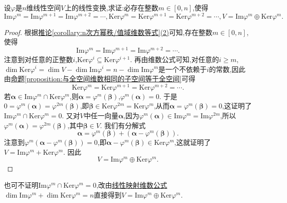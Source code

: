 \documentclass[../../main.tex]{subfiles}%
\begin{document}
\begin{proposition}\label{proposition:线性映射像空间与和空间等式链}
设\(\varphi\)是\(n\)维线性空间\(V\)上的线性变换,求证:必存在整数\(m\in[0,n]\),使得
\[
\text{Im}\varphi^m = \text{Im}\varphi^{m + 1} = \text{Im}\varphi^{m + 2} = \cdots, \text{Ker}\varphi^m = \text{Ker}\varphi^{m + 1} = \text{Ker}\varphi^{m + 2} = \cdots, V = \text{Im}\varphi^m\oplus\text{Ker}\varphi^m.
\]
\end{proposition}
\begin{proof}

根据\hyperref[corollary:n次方幂秩/值域维数等式]{推论\ref{corollary:n次方幂秩/值域维数等式}(2)}可知,存在整数\(m\in[0,n]\),使得
\[
\text{Im}\varphi^m = \text{Im}\varphi^{m + 1} = \text{Im}\varphi^{m + 2} = \cdots.
\]
注意到对任意的正整数\(i\),\(\text{Ker}\varphi^i\subseteq\text{Ker}\varphi^{i + 1}\). 再由维数公式可知,对任意的\(i\geqslant  m\),\(\dim\text{Ker}\varphi^i=\dim V - \dim\text{Im}\varphi^i=n - \dim\text{Im}\varphi^m\)是一个不依赖于\(i\)的常数,因此由\hyperref[proposition:与全空间维数相同的子空间等于全空间]{命题\ref{proposition:与全空间维数相同的子空间等于全空间}}可得
\[
\text{Ker}\varphi^m = \text{Ker}\varphi^{m + 1} = \text{Ker}\varphi^{m + 2} = \cdots.
\]
若\(\boldsymbol{\alpha}\in\text{Im}\varphi^m\cap\text{Ker}\varphi^m\),则\(\boldsymbol{\alpha}=\varphi^m(\boldsymbol{\beta})\),\(\varphi^m(\boldsymbol{\alpha}) = 0\). 于是\(0=\varphi^m(\boldsymbol{\alpha})=\varphi^{2m}(\boldsymbol{\beta})\),即\(\boldsymbol{\beta}\in\text{Ker}\varphi^{2m}=\text{Ker}\varphi^m\),从而\(\boldsymbol{\alpha}=\varphi^m(\boldsymbol{\beta}) = 0\),这证明了\(\text{Im}\varphi^m\cap\text{Ker}\varphi^m = 0\). 又对\(V\)中任一向量\(\boldsymbol{\alpha}\),因为\(\varphi^m(\boldsymbol{\alpha})\in\text{Im}\varphi^m=\text{Im}\varphi^{2m}\),所以\(\varphi^m(\boldsymbol{\alpha})=\varphi^{2m}(\boldsymbol{\beta})\),其中\(\boldsymbol{\beta}\in V\). 我们有分解式
\[
\boldsymbol{\alpha}=\varphi^m(\boldsymbol{\beta})+(\boldsymbol{\alpha}-\varphi^m(\boldsymbol{\beta})).
\]
注意到\(\varphi^m(\boldsymbol{\alpha}-\varphi^m(\boldsymbol{\beta})) = 0\),即\(\boldsymbol{\alpha}-\varphi^m(\boldsymbol{\beta})\in\text{Ker}\varphi^m\),这就证明了\(V=\text{Im}\varphi^m+\text{Ker}\varphi^m\). 因此
\[
V = \text{Im}\varphi^m\oplus\text{Ker}\varphi^m.
\]

\end{proof}
\begin{remark}
也可不证明\(\text{Im}\varphi^m\cap\text{Ker}\varphi^m = 0\),改由\hyperref[theorem:值域和核空间维数之和等于原像空间维数]{线性映射维数公式}\(\dim\text{Im}\varphi^m+\dim\text{Ker}\varphi^m=n\)直接得到\(V=\text{Im}\varphi^m\oplus\text{Ker}\varphi^m\).
\end{remark}
\end{document}
